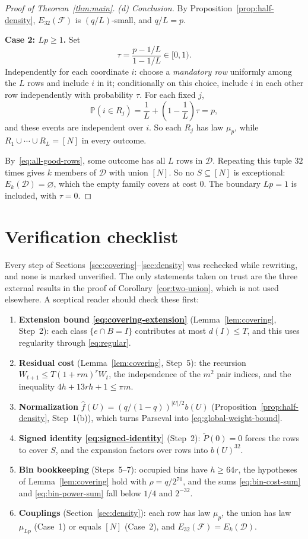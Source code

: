 \documentclass[11pt,letterpaper]{article}
\theoremstyle{definition}
\theoremstyle{remark}
\numberwithin{equation}{section}
\begin{document}
\begin{proof}[Proof of Theorem~\ref{thm:main}]
\emph{(d) Conclusion.} By Proposition~\ref{prop:half-density}, $E_{32}(\mathcal F)$ is $(q/L)$-small, and $q/L=p$.

\medskip\noindent\textbf{Case 2: $Lp\ge1$.}
Set
\[
\tau=\frac{p-1/L}{1-1/L}\in[0,1).
\]
Independently for each coordinate $i$: choose a \emph{mandatory row} uniformly among the $L$ rows and include $i$ in it; conditionally on this choice, include $i$ in each other row independently with probability $\tau$. For each fixed $j$,
\[
\mathbb P(i\in R_j)
=\frac1L+\left(1-\frac1L\right)\tau=p,
\]
and these events are independent over $i$. So each $R_j$ has law $\mu_p$, while $R_1\cup\cdots\cup R_L=[N]$ in every outcome.

By~\eqref{eq:all-good-rows}, some outcome has all $L$ rows in $\mathcal D$. Repeating this tuple $32$ times gives $k$ members of $\mathcal D$ with union $[N]$. So no $S\subseteq[N]$ is exceptional: $E_k(\mathcal D)=\varnothing$, which the empty family covers at cost $0$. The boundary $Lp=1$ is included, with $\tau=0$.
\end{proof}

\section{Verification checklist}

Every step of Sections~\ref{sec:covering}--\ref{sec:density} was rechecked while rewriting, and none is marked unverified. The only statements taken on trust are the three external results in the proof of Corollary~\ref{cor:two-union}, which is not used elsewhere. A sceptical reader should check these first:

\begin{enumerate}
\item \textbf{Extension bound \eqref{eq:covering-extension}} (Lemma~\ref{lem:covering}, Step~2): each class $\{e\cap B=I\}$ contributes at most $d(I)\le T$, and this uses regularity through \eqref{eq:regular}.
\item \textbf{Residual cost} (Lemma~\ref{lem:covering}, Step~5): the recursion $W_{t+1}\le T(1+rm)^rW_t$, the independence of the $m^2$ pair indices, and the inequality $4h+13rh+1\le\pi m$.
\item \textbf{Normalization} $\widehat f(U)=(q/(1-q))^{|U|/2}b(U)$ (Proposition~\ref{prop:half-density}, Step~1(b)), which turns Parseval into \eqref{eq:global-weight-bound}.
\item \textbf{Signed identity \eqref{eq:signed-identity}} (Step~2): $\widetilde P(0)=0$ forces the rows to cover $S$, and the expansion factors over rows into $b(U)^{32}$.
\item \textbf{Bin bookkeeping} (Steps~5--7): occupied bins have $h\ge64r$, the hypotheses of Lemma~\ref{lem:covering} hold with $\rho=q/2^{70}$, and the sums \eqref{eq:bin-cost-sum} and \eqref{eq:bin-power-sum} fall below $1/4$ and $2^{-32}$.
\item \textbf{Couplings} (Section~\ref{sec:density}): each row has law $\mu_p$, the union has law $\mu_{Lp}$ (Case~1) or equals $[N]$ (Case~2), and $E_{32}(\mathcal F)=E_k(\mathcal D)$.
\end{enumerate}
\end{document}
